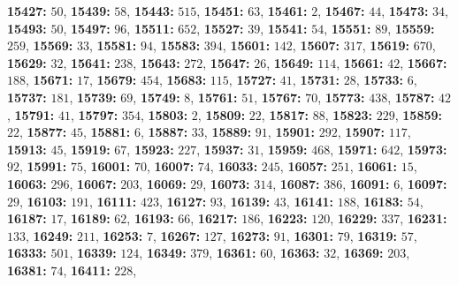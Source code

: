 \textsf{\bfseries 15427:} $50$, \textsf{\bfseries 15439:} $58$, \textsf{\bfseries 15443:} $515$, \textsf{\bfseries 15451:} $63$, \textsf{\bfseries 15461:} $2$, \textsf{\bfseries 15467:} $44$, \textsf{\bfseries 15473:} $34$, \textsf{\bfseries 15493:} $50$, \textsf{\bfseries 15497:} $96$, \textsf{\bfseries 15511:} $652$, \textsf{\bfseries 15527:} $39$, \textsf{\bfseries 15541:} $54$, \textsf{\bfseries 15551:} $89$, \textsf{\bfseries 15559:} $259$, \textsf{\bfseries 15569:} $33$, \textsf{\bfseries 15581:} $94$, \textsf{\bfseries 15583:} $394$, \textsf{\bfseries 15601:} $142$, \textsf{\bfseries 15607:} $317$, \textsf{\bfseries 15619:} $670$, \textsf{\bfseries 15629:} $32$, \textsf{\bfseries 15641:} $238$, \textsf{\bfseries 15643:} $272$, \textsf{\bfseries 15647:} $26$, \textsf{\bfseries 15649:} $114$, \textsf{\bfseries 15661:} $42$, \textsf{\bfseries 15667:} $188$, \textsf{\bfseries 15671:} $17$, \textsf{\bfseries 15679:} $454$, \textsf{\bfseries 15683:} $115$, \textsf{\bfseries 15727:} $41$, \textsf{\bfseries 15731:} $28$, \textsf{\bfseries 15733:} $6$, \textsf{\bfseries 15737:} $181$, \textsf{\bfseries 15739:} $69$, \textsf{\bfseries 15749:} $8$, \textsf{\bfseries 15761:} $51$, \textsf{\bfseries 15767:} $70$, \textsf{\bfseries 15773:} $438$, \textsf{\bfseries 15787:} $42$, \textsf{\bfseries 15791:} $41$, \textsf{\bfseries 15797:} $354$, \textsf{\bfseries 15803:} $2$, \textsf{\bfseries 15809:} $22$, \textsf{\bfseries 15817:} $88$, \textsf{\bfseries 15823:} $229$, \textsf{\bfseries 15859:} $22$, \textsf{\bfseries 15877:} $45$, \textsf{\bfseries 15881:} $6$, \textsf{\bfseries 15887:} $33$, \textsf{\bfseries 15889:} $91$, \textsf{\bfseries 15901:} $292$, \textsf{\bfseries 15907:} $117$, \textsf{\bfseries 15913:} $45$, \textsf{\bfseries 15919:} $67$, \textsf{\bfseries 15923:} $227$, \textsf{\bfseries 15937:} $31$, \textsf{\bfseries 15959:} $468$, \textsf{\bfseries 15971:} $642$, \textsf{\bfseries 15973:} $92$, \textsf{\bfseries 15991:} $75$, \textsf{\bfseries 16001:} $70$, \textsf{\bfseries 16007:} $74$, \textsf{\bfseries 16033:} $245$, \textsf{\bfseries 16057:} $251$, \textsf{\bfseries 16061:} $15$, \textsf{\bfseries 16063:} $296$, \textsf{\bfseries 16067:} $203$, \textsf{\bfseries 16069:} $29$, \textsf{\bfseries 16073:} $314$, \textsf{\bfseries 16087:} $386$, \textsf{\bfseries 16091:} $6$, \textsf{\bfseries 16097:} $29$, \textsf{\bfseries 16103:} $191$, \textsf{\bfseries 16111:} $423$, \textsf{\bfseries 16127:} $93$, \textsf{\bfseries 16139:} $43$, \textsf{\bfseries 16141:} $188$, \textsf{\bfseries 16183:} $54$, \textsf{\bfseries 16187:} $17$, \textsf{\bfseries 16189:} $62$, \textsf{\bfseries 16193:} $66$, \textsf{\bfseries 16217:} $186$, \textsf{\bfseries 16223:} $120$, \textsf{\bfseries 16229:} $337$, \textsf{\bfseries 16231:} $133$, \textsf{\bfseries 16249:} $211$, \textsf{\bfseries 16253:} $7$, \textsf{\bfseries 16267:} $127$, \textsf{\bfseries 16273:} $91$, \textsf{\bfseries 16301:} $79$, \textsf{\bfseries 16319:} $57$, \textsf{\bfseries 16333:} $501$, \textsf{\bfseries 16339:} $124$, \textsf{\bfseries 16349:} $379$, \textsf{\bfseries 16361:} $60$, \textsf{\bfseries 16363:} $32$, \textsf{\bfseries 16369:} $203$, \textsf{\bfseries 16381:} $74$, \textsf{\bfseries 16411:} $228$, 
